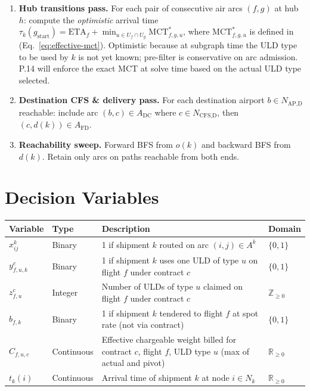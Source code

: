 \documentclass[11pt,a4paper]{article}
\theoremstyle{definition}
\begin{document}
\begin{enumerate}
  \item \textbf{Hub transitions pass.} For each pair of consecutive air arcs $(f, g)$ at hub $h$:
        compute the \emph{optimistic} arrival time $\tau_k(g_{\text{start}}) = \text{ETA}_f
        + \min_{u \in U_f \cap U_g} \text{MCT}^*_{f,g,u}$, where $\text{MCT}^*_{f,g,u}$ is
        defined in (Eq.~\ref{eq:effective-mct}). Optimistic because at subgraph time the
        ULD type to be used by $k$ is not yet known; pre-filter is conservative on arc
        admission. P.14 will enforce the exact MCT at solve time based on the actual
        ULD type selected.

  \item \textbf{Destination CFS \& delivery pass.} For each destination airport $b \in N_{\text{AP,D}}$
        reachable: include arc $(b, c) \in A_{\text{DC}}$ where $c \in N_{\text{CFS,D}}$, then
        $(c, d(k)) \in A_{\text{FD}}$.

  \item \textbf{Reachability sweep.} Forward BFS from $o(k)$ and backward BFS from $d(k)$.
        Retain only arcs on paths reachable from both ends.
\end{enumerate}

\section{Decision Variables}

\begin{center}
\begin{tabular}{llp{7cm}l}
\toprule
Variable & Type & Description & Domain \\
\midrule
$x_{ij}^k$ & Binary & 1 if shipment $k$ routed on arc $(i,j) \in A^k$ & $\{0, 1\}$ \\
$y_{f,u,k}^c$ & Binary & 1 if shipment $k$ uses one ULD of type $u$ on flight $f$ under contract $c$ & $\{0, 1\}$ \\
$z_{f,u}^c$ & Integer & Number of ULDs of type $u$ claimed on flight $f$ under contract $c$ & $\mathbb{Z}_{\geq 0}$ \\
$b_{f,k}$ & Binary & 1 if shipment $k$ tendered to flight $f$ at spot rate (not via contract) & $\{0, 1\}$ \\
$C_{f,u,c}$ & Continuous & Effective chargeable weight billed for contract $c$, flight $f$, ULD type $u$ (max of actual and pivot) & $\mathbb{R}_{\geq 0}$ \\
$t_k(i)$ & Continuous & Arrival time of shipment $k$ at node $i \in N_k$ & $\mathbb{R}_{\geq 0}$ \\
\bottomrule
\end{tabular}
\end{center}
\end{document}
